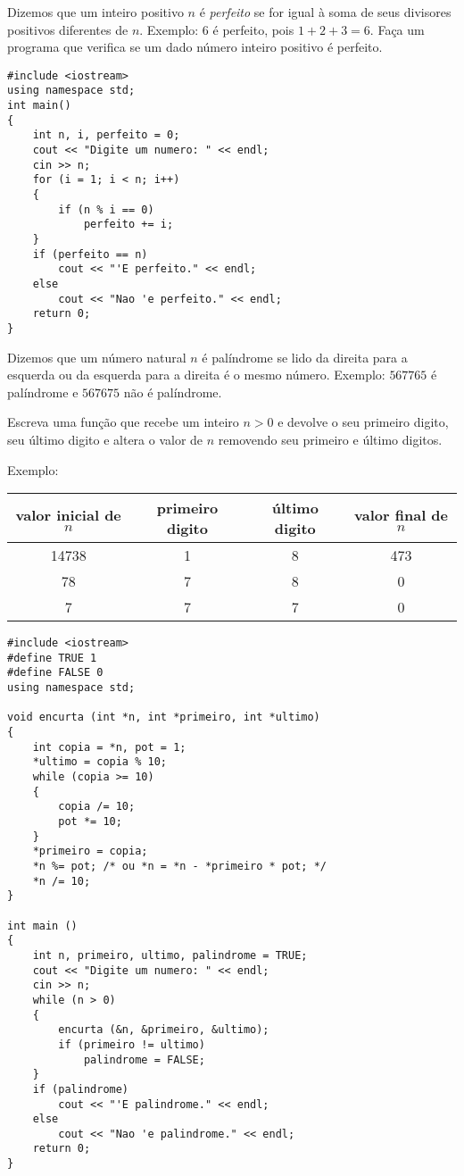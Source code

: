 \documentclass[a4paper]{memoir}
\begin{document}
\begin{prob}\label{prob212.cpp}
Dizemos que um inteiro positivo $n$ é \emph{perfeito} se for igual à soma de seus divisores positivos diferentes de $n$. Exemplo: 6 é perfeito, pois $1 + 2 + 3 = 6$. Faça um programa que verifica se um dado número inteiro positivo é perfeito.
\end{prob}

\begin{sol}
\begin{lstlisting}
#include <iostream>
using namespace std;
int main()
{
    int n, i, perfeito = 0;
    cout << "Digite um numero: " << endl;
    cin >> n;
    for (i = 1; i < n; i++)
    {
        if (n % i == 0)
            perfeito += i;
    }
    if (perfeito == n)
        cout << "'E perfeito." << endl;
    else
        cout << "Nao 'e perfeito." << endl;
    return 0;
}
\end{lstlisting}
\end{sol}

\begin{prob}\label{prob213.cpp}
Dizemos que um número natural $n$ é palíndrome se lido da direita para a esquerda ou da esquerda para a direita é o mesmo número. Exemplo: $567765$ é palíndrome e $567675$ não é palíndrome.

Escreva uma função que recebe um inteiro $n > 0$ e devolve o seu primeiro digito, seu último digito e altera o valor de $n$ removendo seu primeiro e último digitos.

Exemplo:

\begin{center}
\begin{tabular}{cccc}
valor inicial de $n$ & primeiro digito & último digito & valor final de $n$\\
\hline
14738 & 1 & 8 & 473\\
78 & 7 & 8 & 0\\
7 & 7 & 7 & 0
\end{tabular}
\end{center}

\end{prob}

\begin{sol}
\begin{lstlisting}
#include <iostream>
#define TRUE 1
#define FALSE 0
using namespace std;

void encurta (int *n, int *primeiro, int *ultimo)
{
    int copia = *n, pot = 1;
    *ultimo = copia % 10;
    while (copia >= 10)
    {
        copia /= 10;
        pot *= 10;
    }
    *primeiro = copia;
    *n %= pot; /* ou *n = *n - *primeiro * pot; */
    *n /= 10;
}

int main ()
{
    int n, primeiro, ultimo, palindrome = TRUE;
    cout << "Digite um numero: " << endl;
    cin >> n;
    while (n > 0)
    {
        encurta (&n, &primeiro, &ultimo);
        if (primeiro != ultimo)
            palindrome = FALSE;
    }
    if (palindrome)
        cout << "'E palindrome." << endl;
    else
        cout << "Nao 'e palindrome." << endl;
    return 0;
}
\end{lstlisting}
\end{sol}
\end{document}
